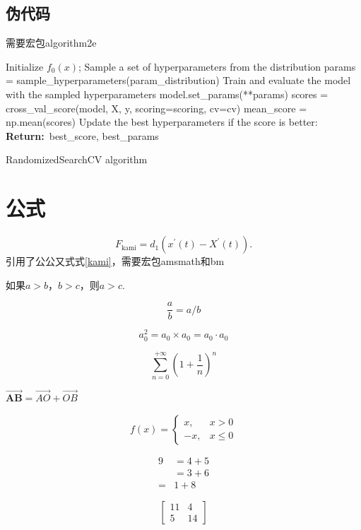 \documentclass[utf8]{ctexart}
\begin{document}
\subsection{伪代码}
需要宏包algorithm2e

\begin{algorithm}
  Initialize $f_0(x)$;
  {
    Sample a set of hyperparameters from the distribution\;
    \quad params = sample\_hyperparameters(param\_distribution)\;
    Train and evaluate the model with the sampled hyperparameters\;
    \quad model.set\_params(**params)\;
    \quad scores = cross\_val\_score(model, X, y, scoring=scoring, cv=cv)\;
    \quad mean\_score = np.mean(scores)\;
    Update the best hyperparameters if the score is better:
    \textbf{Return:}\ best\_score, best\_params
  }
  \caption{RandomizedSearchCV algorithm}\label{Algorithm 2}
\end{algorithm}

\section{公式}
\begin{equation}\label{kami}
  F_\text{kami}=d_1\left(x^{'}(t)-X^{'}(t)\right).    
\end{equation}  
引用了公公又式式\eqref{kami}，需要宏包amsmath和bm

如果$a>b$，$b>c$，则$a>c$.  

$$
\frac{a}{b}=a/b  
$$  

\begin{equation}  
    a^{2}_{0}=a_{0}\times a_0=a_{0} \cdot a_{0}  
\end{equation}

\begin{equation*}  
\sum_{n=0}^{+\infty}\left(1+ \frac{1}{n}\right)^n  
\end{equation*}

$\overrightarrow{\bm{AB}}=\overrightarrow{AO}+\overrightarrow{OB}$

\begin{equation*}
f(x)= \begin{cases}
x, & x>0 \\ 
-x, & x \leq 0
\end{cases}
\end{equation*}

\begin{equation*}
\begin{aligned}
9 & =4+5 \\
& =3+6 \\
= & 1+8
\end{aligned}
\end{equation*}

\begin{equation*}
\begin{bmatrix}
    11 & 4 \\
    5 & 14
\end{bmatrix}
\end{equation*}
\end{document}
